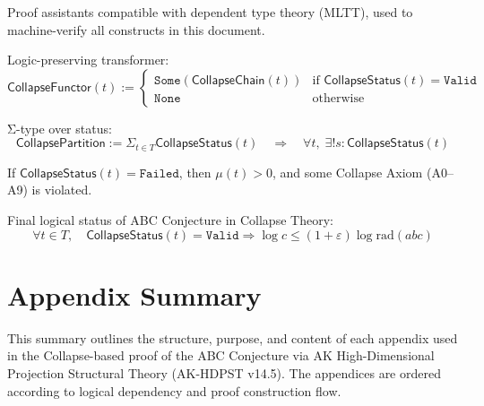 \documentclass[11pt]{article}
\begin{document}
\begin{description}[leftmargin=3.2cm, labelsep=0.8cm]
\item[$\texttt{Coq}$/$\texttt{Lean}$] 
Proof assistants compatible with dependent type theory (MLTT),  
used to machine-verify all constructs in this document.

\item[$\mathsf{CollapseFunctor}(t)$] 
Logic-preserving transformer:
\[
\mathsf{CollapseFunctor}(t) := 
\begin{cases}
\texttt{Some}(\mathsf{CollapseChain}(t)) & \text{if } \mathsf{CollapseStatus}(t) = \texttt{Valid} \\
\texttt{None} & \text{otherwise}
\end{cases}
\]

\item[$\mathsf{CollapsePartition}$] 
Σ-type over status:
\[
\mathsf{CollapsePartition} := \Sigma_{t \in T} \mathsf{CollapseStatus}(t)
\quad\Rightarrow\quad \forall t,\; \exists! s : \mathsf{CollapseStatus}(t)
\]

\item[$\texttt{Collapse Inverse Theorem}$] 
If \( \mathsf{CollapseStatus}(t) = \texttt{Failed} \),  
then \( \mu(t) > 0 \), and some Collapse Axiom (A0–A9) is violated.

\item[$\texttt{Q.E.D.}$] 
Final logical status of ABC Conjecture in Collapse Theory:  
\[
\forall t \in T,\quad \mathsf{CollapseStatus}(t) = \texttt{Valid}
\Rightarrow
\log c \leq (1+\varepsilon)\log \mathrm{rad}(abc)
\]

\end{description}



\section*{Appendix Summary}

This summary outlines the structure, purpose, and content of each appendix used in the  
Collapse-based proof of the ABC Conjecture via AK High-Dimensional Projection Structural Theory (AK-HDPST v14.5).  
The appendices are ordered according to logical dependency and proof construction flow.

\bigskip
\end{document}
